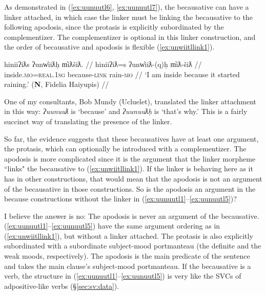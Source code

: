 
As demonstrated in (\ref{ex:uunuutl6}, \ref{ex:uunuutl7}), the becausative can have a linker attached, in which case the linker must be linking the becausative to the following apodosis, since the protasis is explicitly subordinated by the complementizer. The complementizer is optional in this linker construction, and the order of becausative and apodosis is flexible (\ref{ex:unwiitllink1}).

\ex \label{ex:unwiitllink1}
\begingl
\glpreamble hiniiʔiƛs ʔunw̓iiƛḥ m̓iƛšiƛ. //
\gla hiniiʔiƛ=s ʔunw̓iiƛ-(q)ḥ m̓iƛ-šiƛ //
\glb inside.\textsc{mo}=\textsc{real.1sg} because-\textsc{link} rain-\textsc{mo} //
\glft `I am inside because it started raining.' (\textbf{N}, Fidelia Haiyupis) //
\endgl
\xe

One of my consultants, Bob Mundy (Ucluelet), translated the linker attachment in this way: \textit{ʔuunuuƛ} is `because' and \textit{ʔuunuuƛḥ} is `that's why.' This is a fairly succinct way of translating the presence of the linker.

So far, the evidence suggests that these becausatives have at least one argument, the protasis, which can optionally be introduced with a complementizer. The apodosis is more complicated since it is the argument that the linker morpheme ``links" the becausative to (\ref{ex:unwiitllink1}). If the linker is behaving here as it has in other constructions, that would mean that the apodosis is not an argument of the becausative in those constructions. So is the apodosis an argument in the because constructions without the linker in (\ref{ex:uunuutl1}--\ref{ex:uunuutl5})?

I believe the answer is no: The apodosis is never an argument of the becausative. (\ref{ex:uunuutl1}--\ref{ex:uunuutl5}) have the same argument ordering as in (\ref{ex:unwiitllink1}), but without a linker attached. The protasis is also explicitly subordinated with a subordinate subject-mood portmanteau (the definite and the weak moods, respectively). The apodosis is the main predicate of the sentence and takes the main clause's subject-mood portmanteau. If the becausative is a verb, the structure in (\ref{ex:uunuutl1}--\ref{ex:uunuutl5}) is very like the SVCs of adpositive-like verbs (\S\ref{sec:sv:data}).


